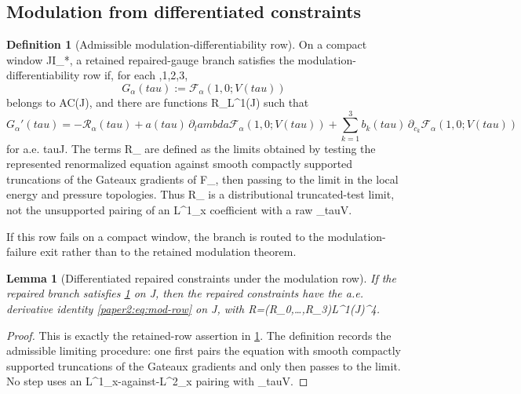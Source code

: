 \documentclass[11pt]{amsart}
\def\({}%
\def\){}%
\def\tau{tau}%
\def\lambda{lambda}%
\theoremstyle{plain}
\newtheorem{lemma}[lemma]{Lemma}
\theoremstyle{definition}
\newtheorem{definition}[definition]{Definition}
\theoremstyle{remark}
\begin{document}
\subsection{Modulation from differentiated constraints}\label{paper2:sec:modulation}
\begin{definition}[Admissible modulation-differentiability row]\label{paper2:def:mod-diff-row}
On a compact window \(J\subset I_*\), a retained repaired-gauge branch satisfies
the modulation-differentiability row if, for each \(,1,2,3\),
\[
G_\alpha(\tau):=\mathcal F_\alpha(1,0;V(\tau))
\]
belongs to \(AC(J)\), and there are functions
\(\mathcal R_\alpha\in L^1(J)\) such that
\begin{equation}\label{paper2:eq:mod-row}
G_\alpha'(\tau)
=-\mathcal R_\alpha(\tau)
+a(\tau)\,\partial_\lambda\mathcal F_\alpha(1,0;V(\tau))
+\sum_{k=1}^3 b_k(\tau)\,\partial_{c_k}\mathcal F_\alpha(1,0;V(\tau))
\end{equation}
for a.e. \(\tau\in J\).  The terms \(\mathcal R_\alpha\) are defined as the
limits obtained by testing the represented renormalized equation against smooth
compactly supported truncations of the Gateaux gradients of
\(\mathcal F_\alpha\), then passing to the limit in the local energy and pressure
topologies.  Thus \(\mathcal R_\alpha\) is a distributional truncated-test limit,
not the unsupported pairing of an \(L^1_x\) coefficient with a raw
\(\partial_\tau V\).

If this row fails on a compact window, the branch is routed to the
modulation-failure exit rather than to the retained modulation theorem.
\end{definition}

\begin{lemma}[Differentiated repaired constraints under the modulation row]\label{paper2:lem:diff-f}
If the repaired branch satisfies \cref{paper2:def:mod-diff-row} on \(J\), then
the repaired constraints have the a.e. derivative identity
\eqref{paper2:eq:mod-row} on \(J\), with
\(\mathcal R=(\mathcal R_0,\ldots,\mathcal R_3)\in L^1(J)^4\).
\end{lemma}

\begin{proof}
This is exactly the retained-row assertion in
\cref{paper2:def:mod-diff-row}.  The definition records the admissible limiting
procedure: one first pairs the equation with smooth compactly supported
truncations of the Gateaux gradients and only then passes to the limit.  No
step uses an \(L^1_x\)-against-\(L^2_x\) pairing with \(\partial_\tau V\).
\end{proof}
\end{document}
